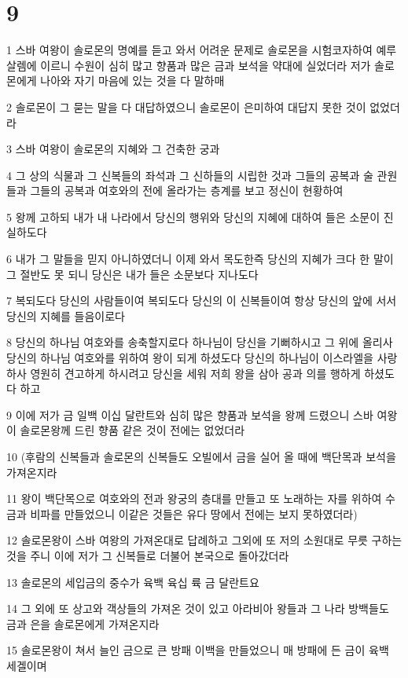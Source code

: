 \chapter{9}

\par 1 스바 여왕이 솔로몬의 명예를 듣고 와서 어려운 문제로 솔로몬을 시험코자하여 예루살렘에 이르니 수원이 심히 많고 향품과 많은 금과 보석을 약대에 실었더라 저가 솔로몬에게 나아와 자기 마음에 있는 것을 다 말하매
\par 2 솔로몬이 그 묻는 말을 다 대답하였으니 솔로몬이 은미하여 대답지 못한 것이 없었더라
\par 3 스바 여왕이 솔로몬의 지혜와 그 건축한 궁과
\par 4 그 상의 식물과 그 신복들의 좌석과 그 신하들의 시립한 것과 그들의 공복과 술 관원들과 그들의 공복과 여호와의 전에 올라가는 층계를 보고 정신이 현황하여
\par 5 왕께 고하되 내가 내 나라에서 당신의 행위와 당신의 지혜에 대하여 들은 소문이 진실하도다
\par 6 내가 그 말들을 믿지 아니하였더니 이제 와서 목도한즉 당신의 지혜가 크다 한 말이 그 절반도 못 되니 당신은 내가 들은 소문보다 지나도다
\par 7 복되도다 당신의 사람들이여 복되도다 당신의 이 신복들이여 항상 당신의 앞에 서서 당신의 지혜를 들음이로다
\par 8 당신의 하나님 여호와를 송축할지로다 하나님이 당신을 기뻐하시고 그 위에 올리사 당신의 하나님 여호와를 위하여 왕이 되게 하셨도다 당신의 하나님이 이스라엘을 사랑하사 영원히 견고하게 하시려고 당신을 세워 저희 왕을 삼아 공과 의를 행하게 하셨도다 하고
\par 9 이에 저가 금 일백 이십 달란트와 심히 많은 향품과 보석을 왕께 드렸으니 스바 여왕이 솔로몬왕께 드린 향품 같은 것이 전에는 없었더라
\par 10 (후람의 신복들과 솔로몬의 신복들도 오빌에서 금을 실어 올 때에 백단목과 보석을 가져온지라
\par 11 왕이 백단목으로 여호와의 전과 왕궁의 층대를 만들고 또 노래하는 자를 위하여 수금과 비파를 만들었으니 이같은 것들은 유다 땅에서 전에는 보지 못하였더라)
\par 12 솔로몬왕이 스바 여왕의 가져온대로 답례하고 그외에 또 저의 소원대로 무릇 구하는 것을 주니 이에 저가 그 신복들로 더불어 본국으로 돌아갔더라
\par 13 솔로몬의 세입금의 중수가 육백 육십 륙 금 달란트요
\par 14 그 외에 또 상고와 객상들의 가져온 것이 있고 아라비아 왕들과 그 나라 방백들도 금과 은을 솔로몬에게 가져온지라
\par 15 솔로몬왕이 쳐서 늘인 금으로 큰 방패 이백을 만들었으니 매 방패에 든 금이 육백 세겔이며
